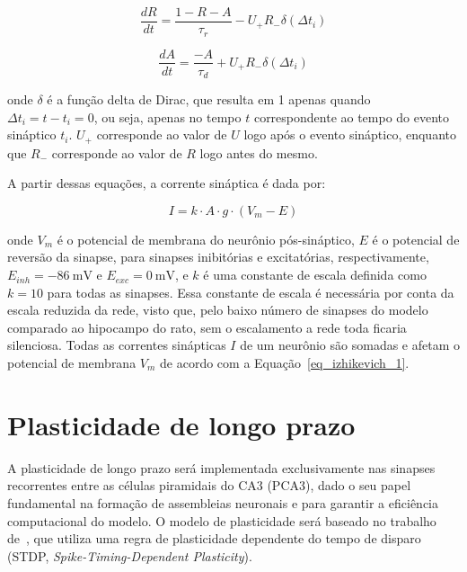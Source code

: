 \begin{equation}
    \label{eq_tsodyks_dR}
    \frac{dR}{dt} = \frac{1-R-A}{\tau_r} - U_{+} R_{-} \delta(\Delta t_i)
\end{equation}

\begin{equation}
    \label{eq_tsodyks_dA}
    \frac{dA}{dt} = \frac{-A}{\tau_d} + U_{+} R_{-} \delta(\Delta t_i)
\end{equation}

onde $\delta$ é a função delta de Dirac, que resulta em 1 apenas quando $\Delta t_i = t - t_i = 0$, ou seja, apenas no tempo $t$
correspondente ao tempo do evento sináptico $t_i$. $U_{+}$ corresponde ao valor de $U$ logo após o evento sináptico, enquanto que
$R_{-}$ corresponde ao valor de $R$ logo antes do mesmo.

A partir dessas equações, a corrente sináptica é dada por:

\begin{equation}
    \label{eq_tsodyks_I}
    I = k \cdot A \cdot g \cdot (V_m - E)
\end{equation}

onde $V_m$ é o potencial de membrana do neurônio pós-sináptico, $E$ é o potencial de reversão da sinapse, para sinapses
inibitórias e excitatórias, respectivamente, $E_{inh} = \SI{-86}{\milli\volt}$ e $E_{exc} = \SI{0}{\milli\volt}$, e $k$ é uma
constante de escala definida como $k = 10$ para todas as sinapses. Essa constante de escala é necessária por conta da escala
reduzida da rede, visto que, pelo baixo número de sinapses do modelo comparado ao hipocampo do rato, sem o escalamento a rede toda
ficaria silenciosa. Todas as correntes sinápticas $I$ de um neurônio são somadas e afetam o potencial de membrana $V_m$ de acordo
com a Equação~\ref{eq_izhikevich_1}.





\section{Plasticidade de longo prazo}

A plasticidade de longo prazo será implementada exclusivamente nas sinapses recorrentes entre as células piramidais do CA3 (PCA3),
dado o seu papel fundamental na formação de assembleias neuronais e para garantir a eficiência computacional do modelo. O modelo
de plasticidade será baseado no trabalho de~, que utiliza uma regra de plasticidade dependente do
tempo de disparo (STDP, \textit{Spike-Timing-Dependent Plasticity}).

